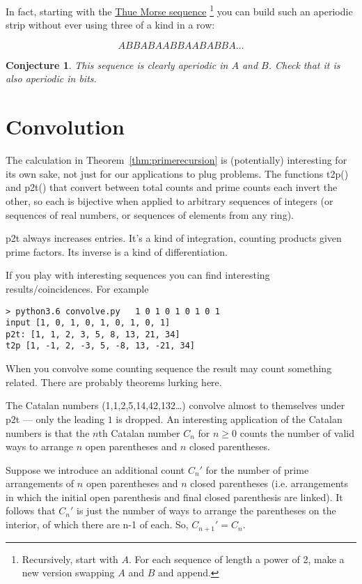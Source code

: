 \documentclass[10pt]{article}
\newtheorem{conjecture}[theorem]{Conjecture}
\numberwithin{equation}{section}
\begin{document}
In fact, starting with the \href{https://en.wikipedia.org/wiki/Thue-Morse_sequence}{Thue Morse sequence}
\footnote{ Recursively, start with $A$. For each sequence of length a power of 2, make a new version swapping $A$ and $B$ and append.}
you can build such an aperiodic strip without ever using three of a kind in a row:  

\begin{equation*}
  A B  BA BAAB BAABABBA \ldots  
\end{equation*}

\begin{conjecture}
This sequence is clearly aperiodic in $A$ and $B$. Check that it is also aperiodic in bits.
\end{conjecture}
\section{Convolution}\label{sec:convolution}


The calculation in Theorem~\ref{thm:primerecursion} is (potentially) interesting for its own sake, not just for our applications to plug problems. The functions t2p() and p2t() that convert between total counts and prime counts each invert the other, so each is bijective when applied to arbitrary sequences of integers (or sequences of real numbers, or sequences of elements from any ring).

p2t always increases entries. It's a kind of integration, counting products given prime factors. Its inverse is a kind of differentiation. 

If you play with interesting sequences you can find interesting results/coincidences. For example

\begin{verbatim}
> python3.6 convolve.py   1 0 1 0 1 0 1 0 1
input [1, 0, 1, 0, 1, 0, 1, 0, 1]
p2t: [1, 1, 2, 3, 5, 8, 13, 21, 34]
t2p [1, -1, 2, -3, 5, -8, 13, -21, 34]
\end{verbatim}

When you convolve some counting sequence the result may count something related. There are probably theorems lurking here.

The Catalan numbers (1,1,2,5,14,42,132\ldots) convolve almost to themselves under p2t --- only the leading $1$ is dropped. An interesting application of the Catalan numbers is that the $n$th Catalan number $C_n$ for $n\geq 0$ counts the number of valid ways to arrange $n$ open parentheses and $n$ closed parentheses.

Suppose we introduce an additional count $C_n'$ for the number of prime arrangements of $n$ open parentheses and $n$ closed parentheses (i.e. arrangements in which the initial open parenthesis and final closed parenthesis are linked). It follows that $C_n'$ is just the number of ways to arrange the parentheses on the interior, of which there are n-1 of each. So, $C_{n+1}'=C_n$.
\end{document}
